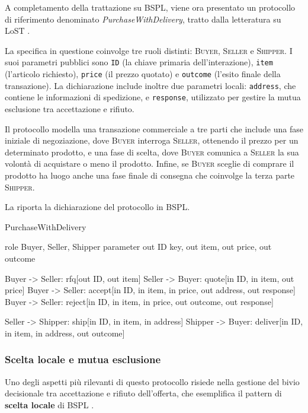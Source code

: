 A completamento della trattazione su BSPL, viene ora presentato un protocollo di riferimento 
denominato \emph{PurchaseWithDelivery}, tratto dalla letteratura su LoST \autocite{singh2011lost}. 

La specifica in questione coinvolge tre ruoli distinti: \textsc{Buyer}, \textsc{Seller} e \textsc{Shipper}. 
I suoi parametri pubblici sono \texttt{ID} (la chiave primaria dell'interazione), \texttt{item} (l'articolo richiesto), 
\texttt{price} (il prezzo quotato) e \texttt{outcome} (l'esito finale della transazione). 
La dichiarazione include inoltre due parametri locali: \texttt{address}, che contiene le informazioni di spedizione, 
e \texttt{response}, utilizzato per gestire la mutua esclusione tra accettazione e rifiuto.

Il protocollo modella una transazione commerciale a tre parti che include una fase iniziale di negoziazione, dove \textsc{Buyer}
interroga \textsc{Seller}, ottenendo il prezzo per un determinato prodotto, e una fase di scelta, dove \textsc{Buyer} comunica a 
\textsc{Seller} la sua volontà di acquistare o meno il prodotto. Infine, se \textsc{Buyer} sceglie di comprare il prodotto
ha luogo anche una fase finale di consegna che coinvolge la terza parte \textsc{Shipper}.

La  riporta la dichiarazione del protocollo in BSPL.

\begin{bspllisting}[caption={Dichiarazione del protocollo PurchaseWithDelivery in BSPL.}, label={lst:bspl_purchasewithdelivery}]
PurchaseWithDelivery {
    role Buyer, Seller, Shipper
    parameter out ID key, out item, out price, out outcome

    Buyer -> Seller: rfq[out ID, out item]
    Seller -> Buyer: quote[in ID, in item, out price]
    Buyer -> Seller: accept[in ID, in item, in price, out address, out response]
    Buyer -> Seller: reject[in ID, in item, in price, out outcome, out response]

    Seller -> Shipper: ship[in ID, in item, in address]
    Shipper -> Buyer: deliver[in ID, in item, in address, out outcome]
}
\end{bspllisting}

\subsubsection{Scelta locale e mutua esclusione}\label{bspl:scelta-locale}

Uno degli aspetti più rilevanti di questo protocollo risiede nella gestione del bivio decisionale tra accettazione 
e rifiuto dell'offerta, che esemplifica il pattern di \textbf{scelta locale} di BSPL \autocite{singh2011bspl}.

